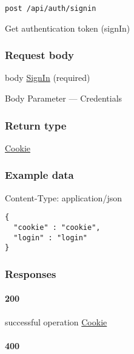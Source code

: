 
\protect\hypertarget{signIn}{}{}



\begin{verbatim}
post /api/auth/signin
\end{verbatim}

Get authentication token ({signIn})

\hypertarget{request-body-1}{%
\subsubsection*{Request body}\label{request-body-1}}

body \protect\hyperlink{SignIn}{SignIn} (required)

{Body Parameter} --- Credentials

\hypertarget{return-type-2}{%
\subsubsection*{Return type}\label{return-type-2}}

\protect\hyperlink{Cookie}{Cookie}

\hypertarget{example-data-2}{%
\subsubsection*{Example data}\label{example-data-2}}

Content-Type: application/json

\begin{verbatim}
{
  "cookie" : "cookie",
  "login" : "login"
}
\end{verbatim}

\hypertarget{responses-2}{%
\subsubsection*{Responses}\label{responses-2}}

\hypertarget{section-9}{%
\paragraph{200}\label{section-9}}

successful operation \protect\hyperlink{Cookie}{Cookie}

\hypertarget{section-10}{%
\paragraph{400}\label{section-10}}

